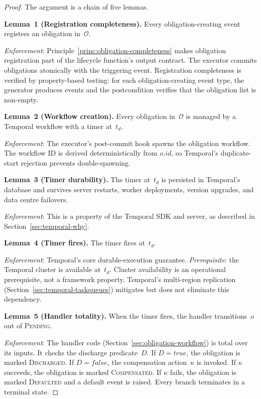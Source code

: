 \documentclass[11pt,a4paper]{article}
\begin{document}
\begin{proof}
The argument is a chain of five lemmas.

\medskip
\noindent\textbf{Lemma~1 (Registration completeness).} Every obligation-creating event registers an obligation in~$\mathcal{O}$.

\textit{Enforcement}: Principle~\ref{princ:obligation-completeness} makes obligation registration part of the lifecycle function's output contract. The executor commits obligations atomically with the triggering event. Registration completeness is verified by property-based testing: for each obligation-creating event type, the generator produces events and the postcondition verifies that the obligation list is non-empty.

\medskip
\noindent\textbf{Lemma~2 (Workflow creation).} Every obligation in~$\mathcal{O}$ is managed by a Temporal workflow with a timer at~$t_d$.

\textit{Enforcement}: The executor's post-commit hook spawns the obligation workflow. The workflow ID is derived deterministically from $o.\mathit{id}$, so Temporal's duplicate-start rejection prevents double-spawning.

\medskip
\noindent\textbf{Lemma~3 (Timer durability).} The timer at~$t_d$ is persisted in Temporal's database and survives server restarts, worker deployments, version upgrades, and data centre failovers.

\textit{Enforcement}: This is a property of the Temporal SDK and server, as described in Section~\ref{sec:temporal-why}.

\medskip
\noindent\textbf{Lemma~4 (Timer fires).} The timer fires at~$t_d$.

\textit{Enforcement}: Temporal's core durable-execution guarantee. \textit{Prerequisite}: the Temporal cluster is available at~$t_d$. Cluster availability is an operational prerequisite, not a framework property. Temporal's multi-region replication (Section~\ref{sec:temporal-taskqueues}) mitigates but does not eliminate this dependency.

\medskip
\noindent\textbf{Lemma~5 (Handler totality).} When the timer fires, the handler transitions~$o$ out of \textsc{Pending}.

\textit{Enforcement}: The handler code (Section~\ref{sec:obligation-workflow}) is total over its inputs. It checks the discharge predicate~$D$. If $D = \mathit{true}$, the obligation is marked \textsc{Discharged}. If $D = \mathit{false}$, the compensation action~$\kappa$ is invoked. If $\kappa$ succeeds, the obligation is marked \textsc{Compensated}. If $\kappa$ fails, the obligation is marked \textsc{Defaulted} and a default event is raised. Every branch terminates in a terminal state.


\end{proof}
\end{document}

